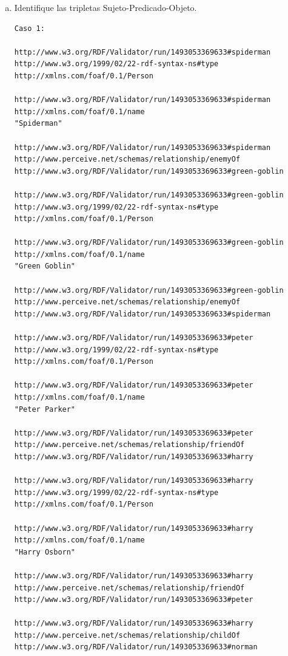 \documentclass[a4paper,12pt,twoside,final,spanish]{article}
\begin{document}
\begin{enumerate}[a.]
\item Identifique las tripletas Sujeto-Predicado-Objeto.

\dotfill

\begin{lstlisting}
Caso 1:

http://www.w3.org/RDF/Validator/run/1493053369633#spiderman
http://www.w3.org/1999/02/22-rdf-syntax-ns#type
http://xmlns.com/foaf/0.1/Person

http://www.w3.org/RDF/Validator/run/1493053369633#spiderman
http://xmlns.com/foaf/0.1/name
"Spiderman"

http://www.w3.org/RDF/Validator/run/1493053369633#spiderman
http://www.perceive.net/schemas/relationship/enemyOf
http://www.w3.org/RDF/Validator/run/1493053369633#green-goblin

http://www.w3.org/RDF/Validator/run/1493053369633#green-goblin
http://www.w3.org/1999/02/22-rdf-syntax-ns#type
http://xmlns.com/foaf/0.1/Person

http://www.w3.org/RDF/Validator/run/1493053369633#green-goblin
http://xmlns.com/foaf/0.1/name
"Green Goblin"

http://www.w3.org/RDF/Validator/run/1493053369633#green-goblin
http://www.perceive.net/schemas/relationship/enemyOf
http://www.w3.org/RDF/Validator/run/1493053369633#spiderman

http://www.w3.org/RDF/Validator/run/1493053369633#peter
http://www.w3.org/1999/02/22-rdf-syntax-ns#type
http://xmlns.com/foaf/0.1/Person

http://www.w3.org/RDF/Validator/run/1493053369633#peter
http://xmlns.com/foaf/0.1/name
"Peter Parker"

http://www.w3.org/RDF/Validator/run/1493053369633#peter
http://www.perceive.net/schemas/relationship/friendOf
http://www.w3.org/RDF/Validator/run/1493053369633#harry

http://www.w3.org/RDF/Validator/run/1493053369633#harry
http://www.w3.org/1999/02/22-rdf-syntax-ns#type
http://xmlns.com/foaf/0.1/Person

http://www.w3.org/RDF/Validator/run/1493053369633#harry
http://xmlns.com/foaf/0.1/name
"Harry Osborn"

http://www.w3.org/RDF/Validator/run/1493053369633#harry
http://www.perceive.net/schemas/relationship/friendOf
http://www.w3.org/RDF/Validator/run/1493053369633#peter

http://www.w3.org/RDF/Validator/run/1493053369633#harry
http://www.perceive.net/schemas/relationship/childOf
http://www.w3.org/RDF/Validator/run/1493053369633#norman


\end{lstlisting}
\end{enumerate}
\end{document}
